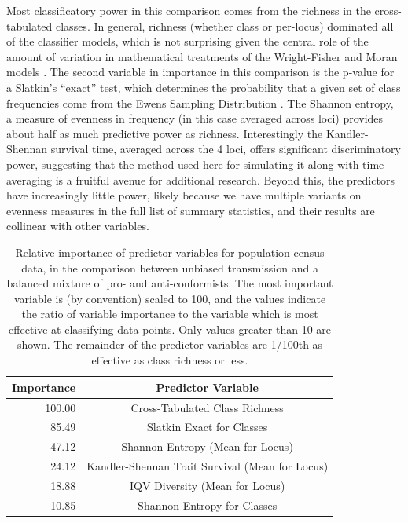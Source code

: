 Most classificatory power in this comparison comes from the richness in the cross-tabulated classes.  In general, richness (whether class or per-locus) dominated all of the classifier models, which is not surprising given the central role of the amount of variation in mathematical treatments of the Wright-Fisher and Moran models \citep{Ewens2004}.  The second variable in importance in this comparison is the p-value for a Slatkin's ``exact'' test, which determines the probability that a given set of class frequencies come from the Ewens Sampling Distribution \citep{slatkin1994exact}.  The Shannon entropy, a measure of evenness in frequency (in this case averaged across loci) provides about half as much predictive power as richness. Interestingly the Kandler-Shennan survival time, averaged across the 4 loci, offers significant discriminatory power, suggesting that the method used here for simulating it along with time averaging is a fruitful avenue for additional research.  Beyond this, the predictors have increasingly little power, likely because we have multiple variants on evenness measures in the full list of summary statistics, and their results are collinear with other variables. 

\begin{table}[ht]
\begin{tabular}{rc}
  \hline
Importance & Predictor Variable \\
  \hline
100.00 & Cross-Tabulated Class Richness \\
  85.49 & Slatkin Exact for Classes \\
  47.12 & Shannon Entropy (Mean for Locus) \\
  24.12 & Kandler-Shennan Trait Survival (Mean for Locus) \\
  18.88 & IQV Diversity (Mean for Locus) \\
  10.85 & Shannon Entropy for Classes \\   
  \hline
\end{tabular}
\caption{Relative importance of predictor variables for population census data, in the comparison between unbiased transmission and a balanced mixture of pro- and anti-conformists.  The most important variable is (by convention) scaled to 100, and the values indicate the ratio of variable importance to the variable which is most effective at classifying data points. Only values greater than 10 are shown. The remainder of the predictor variables are 1/100th as effective as class richness or less.}
\label{ctmixtures:tab:varimp-balbiased-census}
\end{table}

